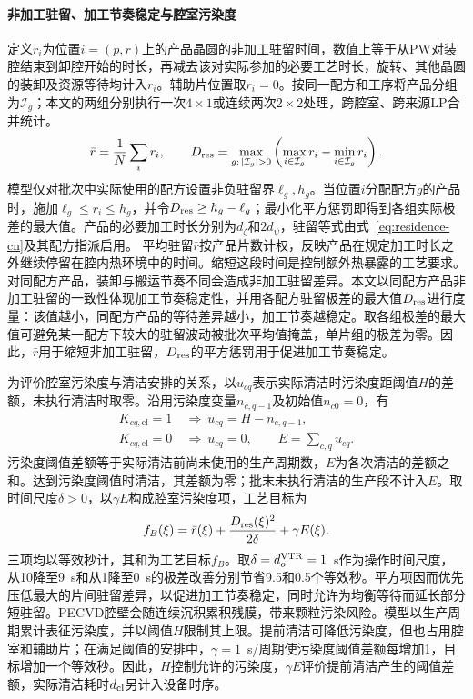 \documentclass[preprint,12pt,nonatbib]{elsarticle}
\begin{document}
\paragraph{非加工驻留、加工节奏稳定与腔室污染度}
定义$r_i$为位置$i=(p,r)$上的产品晶圆的非加工驻留时间，数值上等于从PW对装腔结束到卸腔开始的时长，再减去该对实际参加的必要工艺时长，旋转、其他晶圆的装卸及资源等待均计入$r_i$。辅助片位置取$r_i=0$。按同一配方和工序将产品分组为$\mathcal I_g$；本文的两组分别执行一次$4\times1$或连续两次$2\times2$处理，跨腔室、跨来源LP合并统计。
\begin{equation}
\bar r=\frac{1}{N}\sum_i r_i,\qquad
D_{\rm res}=\max_{g:\,|\mathcal I_g|>0}
\left(\max_{i\in\mathcal I_g}r_i-\min_{i\in\mathcal I_g}r_i\right).
\label{eq:secondary-residence-cn}
\end{equation}
模型仅对批次中实际使用的配方设置非负驻留界$\ell_g,h_g$。当位置$i$分配配方$g$的产品时，施加$\ell_g\le r_i\le h_g$，并令$D_{\rm res}\ge h_g-\ell_g$；最小化平方惩罚即得到各组实际极差的最大值。产品的必要加工时长分别为$d_\zeta$和$2d_\psi$，驻留等式由式~\eqref{eq:residence-cn}及其配方指派启用。
平均驻留$\bar r$按产品片数计权，反映产品在规定加工时长之外继续停留在腔内热环境中的时间。缩短这段时间是控制额外热暴露的工艺要求。对同配方产品，装卸与搬运节奏不同会造成非加工驻留差异。本文以同配方产品非加工驻留的一致性体现加工节奏稳定性，并用各配方驻留极差的最大值$D_{\rm res}$进行度量：该值越小，同配方产品的等待差异越小，加工节奏越稳定。取各组极差的最大值可避免某一配方下较大的驻留波动被批次平均值掩盖，单片组的极差为零。因此，$\bar r$用于缩短非加工驻留，$D_{\rm res}$的平方惩罚用于促进加工节奏稳定。

为评价腔室污染度与清洁安排的关系，以$u_{cq}$表示实际清洁时污染度距阈值$H$的差额，未执行清洁时取零。沿用污染度变量$n_{c,q-1}$及初始值$n_{c0}=0$，有
\begin{equation}
\begin{aligned}
K_{cq,\mathrm{cl}}=1 &\ \Rightarrow\ u_{cq}=H-n_{c,q-1},\\
K_{cq,\mathrm{cl}}=0 &\ \Rightarrow\ u_{cq}=0,\qquad
E=\sum_{c,q}u_{cq}.
\end{aligned}
\label{eq:secondary-clean-cn}
\end{equation}
污染度阈值差额等于实际清洁前尚未使用的生产周期数，$E$为各次清洁的差额之和。达到污染度阈值时清洁，其差额为零；批末未执行清洁的生产段不计入$E$。取时间尺度$\delta>0$，以$\gamma E$构成腔室污染度项，工艺目标为
\begin{equation}
f_B(\xi)=\bar r(\xi)+\frac{D_{\rm res}(\xi)^2}{2\delta}+\gamma E(\xi).
\label{eq:secondary-objective-cn}
\end{equation}
三项均以等效秒计，其和为工艺目标$f_B$。取$\delta=d_o^{\rm VTR}=1$~s作为操作时间尺度，从10降至9~s和从1降至0~s的极差改善分别节省9.5和0.5个等效秒。平方项因而优先压低最大的片间驻留差异，以促进加工节奏稳定，同时允许为均衡等待而延长部分短驻留。PECVD腔壁会随连续沉积累积残膜，带来颗粒污染风险\citep{lee2025wall}。模型以生产周期累计表征污染度，并以阈值$H$限制其上限。提前清洁可降低污染度，但也占用腔室和辅助片；在满足阈值的安排中，$\gamma=1$~s/周期使污染度阈值差额每增加1，目标增加一个等效秒。因此，$H$控制允许的污染度，$\gamma E$评价提前清洁产生的阈值差额，实际清洁耗时$d_{\rm cl}$另计入设备时序。
\end{document}
